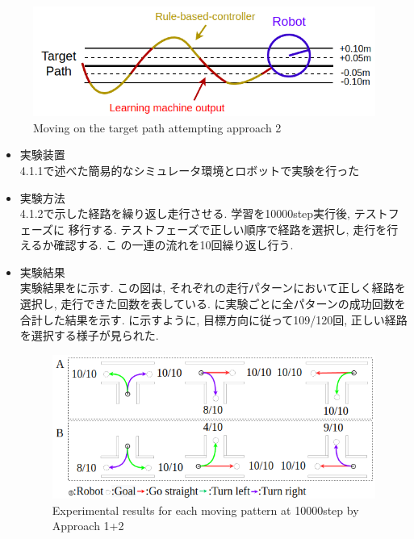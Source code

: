 \begin{figure}[hbtp]
  \centering
 \includegraphics[keepaspectratio, scale=0.58]
      {images/act1.5.png}
 \caption{Moving on the target path attempting approach 2}
 \label{Fig:act1.5}
\end{figure}

\begin{itemize}
  \item 実験装置\\
  4.1.1で述べた簡易的なシミュレータ環境とロボットで実験を行った
  \item 実験方法\\
  4.1.2で示した経路を繰り返し走行させる. 学習を10000step実行後, テストフェーズに
  移行する. テストフェーズで正しい順序で経路を選択し, 走行を行えるか確認する. こ
  の一連の流れを10回繰り返し行う.
  \item 実験結果\\
  実験結果をに示す. この図は, それぞれの走行パターンにおいて正しく経路を選択し, 走行できた回数を表している. に実験ごとに全パターンの成功回数を合計した結果を示す. 
  に示すように, 目標方向に従って109/120回, 正しい経路を選択する様子が見られた. 

  
  \begin{figure}[hbtp]
    \centering
   \includegraphics[keepaspectratio, scale=0.55]
        {images/10000step_act1.5.png}
   \caption{Experimental results for each moving pattern at 10000step by Approach 1+2}
   \label{Fig:10000step_act1.5}
  \end{figure}  
  

\end{itemize}
